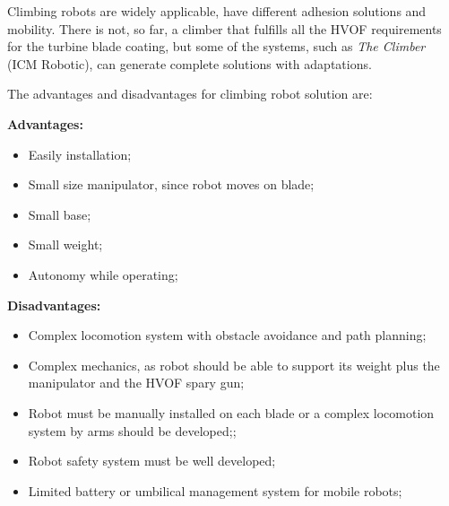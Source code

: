 Climbing robots are widely applicable, have different adhesion solutions and
mobility. There is not, so far, a climber that fulfills all the HVOF
requirements for the turbine blade coating, but some of the systems, such as
\emph{The Climber} (ICM Robotic), can generate complete solutions with
adaptations.

The advantages and disadvantages for climbing robot solution are:

\textbf{Advantages:}
\begin{itemize}
  \item Easily installation;
  \item Small size manipulator, since robot moves on blade;
  \item Small base;
  \item Small weight;
  \item Autonomy while operating; 
\end{itemize}

\textbf{Disadvantages:}
\begin{itemize}
  \item Complex locomotion system with obstacle avoidance and path
  planning;
  \item Complex mechanics, as robot should be able to support its weight plus
  the manipulator and the HVOF spary gun;
  \item Robot must be manually installed on each blade or a complex locomotion
  system by arms should be developed;;
  \item Robot safety system must be well developed;
  \item Limited battery or umbilical management system for mobile robots;
\end{itemize}